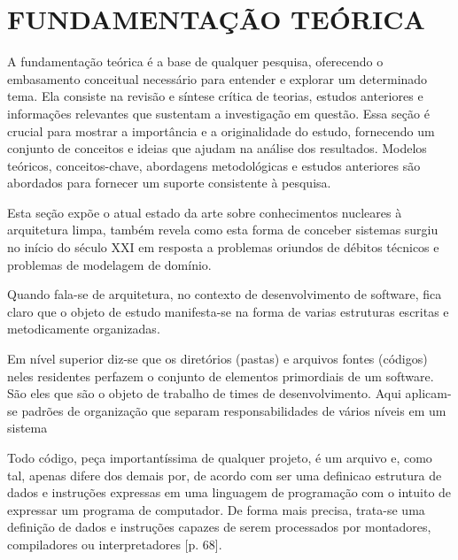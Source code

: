 


\section{\textbf{FUNDAMENTAÇÃO TEÓRICA}}
    \label{cha:fundamentacao-teorica}

   A fundamentação teórica é a base de qualquer pesquisa, oferecendo o embasamento
   conceitual necessário para entender e explorar um determinado tema. Ela consiste
   na revisão e síntese crítica de teorias, estudos anteriores e informações relevantes
   que sustentam a investigação em questão. Essa seção é crucial para mostrar a
   importância e a originalidade do estudo, fornecendo um conjunto de conceitos e
   ideias que ajudam na análise dos resultados. Modelos teóricos, conceitos-chave,
   abordagens metodológicas e estudos anteriores são abordados para fornecer um suporte
   consistente à pesquisa. 



    Esta seção expõe o atual estado da arte sobre conhecimentos nucleares à arquitetura limpa,
    também revela como esta forma de conceber sistemas surgiu no início do século XXI em
    resposta a problemas oriundos de débitos técnicos e problemas de modelagem de domínio.

    Quando fala-se de arquitetura, no contexto de desenvolvimento de software, fica claro que
    o objeto de estudo manifesta-se na forma de varias estruturas escritas e metodicamente
    organizadas.
  
    Em nível superior diz-se que os diretórios (pastas) e arquivos fontes (códigos) neles
    residentes perfazem o conjunto de elementos primordiais de um software. São eles que
    são o objeto de trabalho de times de desenvolvimento. Aqui aplicam-se padrões de organização
    que separam responsabilidades de vários níveis em um sistema %

    Todo código, peça importantíssima de qualquer projeto, é um arquivo e, como tal, apenas difere
    dos demais por, de acordo com 
    ser uma definicao estrutura de dados e instruções expressas em uma linguagem de programação com o
    intuito de expressar um programa de computador. De forma mais precisa, trata-se uma
    definição de dados e instruções capazes de serem processados por montadores, compiladores ou interpretadores \cite{IEEEGlossary}[p. 68].

